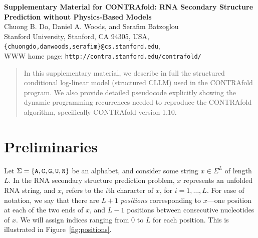 \documentclass{article}
\newcommand{\A}{\texttt{A}}
\newcommand{\U}{\texttt{U}}
\newcommand{\G}{\texttt{G}}
\newcommand{\C}{\texttt{C}}
\newcommand{\N}{\texttt{N}}
\begin{document}
  
  \begin{center}
    \textbf{\large Supplementary Material for \vskip 0.5cm \Large CONTRAfold: RNA Secondary Structure Prediction without Physics-Based Models} \\
    \vskip 0.5cm
    Chuong B. Do, Daniel A. Woods, and Serafim Batzoglou \\
    \vskip 0.5cm
    Stanford University, Stanford, CA 94305, USA, \\
    \texttt{\{chuongdo,danwoods,serafim\}@cs.stanford.edu}, \\
    WWW home page: \texttt{http://contra.stanford.edu/contrafold/}    
  \end{center}
  \vskip 0.5cm

  \begin{abstract}
    In this supplementary material, we describe in full the structured
    conditional log-linear model (structured CLLM) used in the CONTRAfold
    program.  We also provide detailed pseudocode explicitly showing the 
    dynamic programming recurrences needed to reproduce the CONTRAfold
    algorithm, specifically CONTRAfold version 1.10.
  \end{abstract}

  \section{Preliminaries}

  Let $\Sigma = \set{\A,\C,\G,\U,\N}$ be an alphabet, and consider
  some string $x \in \Sigma^L$ of length $L$.  In the RNA secondary
  structure prediction problem, $x$ represents an unfolded RNA string,
  and $x_i$ refers to the $i$th character of $x$, for $i=1,\ldots,L$.  
  For ease of notation, we say that there are $L+1$
  \emph{positions} corresponding to $x$---one position at each of the two
  ends of $x$, and $L-1$ positions between consecutive nucleotides of $x$.
  We will assign indices ranging from 0 to $L$ for each position.  This is
  illustrated in Figure~\ref{fig:positions}.
\end{document}
